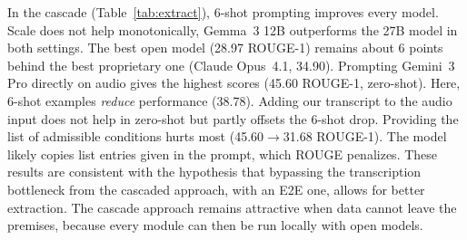 \documentclass{article}
\begin{document}
In the cascade (Table~\ref{tab:extract}), 6-shot prompting improves every model.
Scale does not help monotonically, Gemma~3 12B outperforms the 27B model in both settings.
The best open model (28.97 ROUGE-1) remains about 6 points behind the best proprietary one (Claude Opus~4.1, 34.90).
Prompting Gemini~3 Pro directly on audio gives the highest scores (45.60 ROUGE-1, zero-shot).
Here, 6-shot examples \emph{reduce} performance (38.78).
Adding our transcript to the audio input does not help in zero-shot but partly offsets the 6-shot drop. Providing the list of admissible conditions hurts most (45.60$\rightarrow$31.68 ROUGE-1). The model likely copies list entries given in the prompt, which ROUGE penalizes.
These results are consistent with the hypothesis that bypassing the transcription bottleneck from the cascaded approach, with an E2E one, allows for better extraction.
The cascade approach remains attractive when data cannot leave the premises, because every module can then be run locally with open models.
\end{document}
